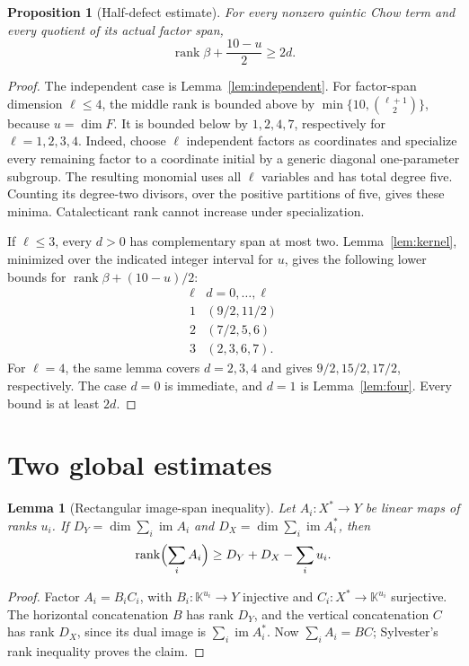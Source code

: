 \documentclass[11pt]{amsart}
\newtheorem{lemma}[theorem]{Lemma}
\newtheorem{proposition}[theorem]{Proposition}
\theoremstyle{definition}
\numberwithin{equation}{section}
\newcommand{\K}{\mathbb K}
\newcommand{\im}{\operatorname{im}}
\newcommand{\rank}{\operatorname{rank}}
\begin{document}
\begin{proposition}[Half-defect estimate]\label{prop:local}
For every nonzero quintic Chow term and every quotient of its actual factor
span,
\[\boxed{\rank\beta+\frac{10-u}{2}\ge2d.}\]
\end{proposition}
\begin{proof}
The independent case is Lemma~\ref{lem:independent}. For factor-span
dimension \(\ell\le4\), the middle rank is bounded above by
\(\min\{10,\binom{\ell+1}{2}\}\), because \(u=\dim F\).
It is bounded below by \(1,2,4,7\), respectively for
\(\ell=1,2,3,4\). Indeed, choose \(\ell\) independent factors as
coordinates and specialize every remaining factor to a coordinate initial
by a generic diagonal one-parameter subgroup. The resulting monomial uses
all \(\ell\) variables and has total degree five. Counting its degree-two
divisors, over the positive partitions of five, gives these minima.
Catalecticant rank cannot increase under specialization.

If \(\ell\le3\), every \(d>0\) has complementary span at most two.
Lemma~\ref{lem:kernel}, minimized over the indicated integer interval for
\(u\), gives the following lower bounds for
\(\rank\beta+(10-u)/2\):
\[
\begin{array}{c|c}
\ell& d=0,\ldots,\ell\\\hline
1&(9/2,11/2)\\
2&(7/2,5,6)\\
3&(2,3,6,7).
\end{array}
\]
For \(\ell=4\), the same lemma covers \(d=2,3,4\) and gives
\(9/2,15/2,17/2\), respectively. The case \(d=0\) is immediate, and
\(d=1\) is Lemma~\ref{lem:four}. Every bound is at least \(2d\).
\end{proof}

\section{Two global estimates}
\begin{lemma}[Rectangular image-span inequality]\label{lem:rectangular}
Let \(A_i:X^*\to Y\) be linear maps of ranks \(u_i\). If
\(D_Y=\dim\sum_i\im A_i\) and
\(D_X=\dim\sum_i\im A_i^*\), then
\[\rank\Bigl(\sum_iA_i\Bigr)\ge D_Y+D_X-\sum_i u_i.\]
\end{lemma}
\begin{proof}
Factor \(A_i=B_iC_i\), with \(B_i:\K^{u_i}\to Y\) injective and
\(C_i:X^*\to\K^{u_i}\) surjective. The horizontal concatenation \(B\)
has rank \(D_Y\), and the vertical concatenation \(C\) has rank
\(D_X\), since its dual image is \(\sum_i\im A_i^*\).
Now \(\sum_iA_i=BC\); Sylvester's rank inequality proves the claim.
\end{proof}
\end{document}
